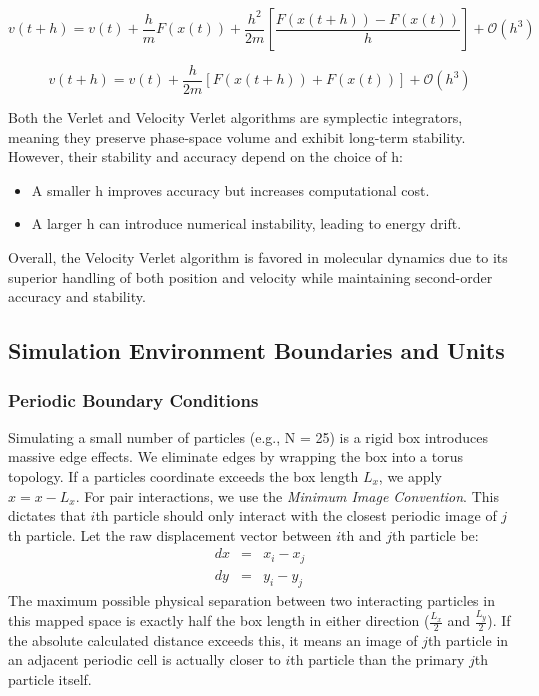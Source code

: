 \documentclass[12pt, a4paper, oneside]{article}
\begin{document}
            $$v(t+h) = v(t) + \frac{h}{m} F(x(t)) + \frac{h^2}{2m} \left[\frac{F(x(t+h)) - F(x(t))}{h}\right] + \mathcal{O}(h^3)$$

            \begin{equation}
                \label{eq9: Velocity verlet (Velocity Update)}
                v(t+h) = v(t) + \frac{h}{2m} \left[F(x(t+h)) + F(x(t))\right] + \mathcal{O}(h^3)
            \end{equation}
            
            Both the Verlet and Velocity Verlet algorithms are symplectic integrators, meaning they preserve phase-space volume and exhibit long-term stability. However, their stability and accuracy depend on the choice of h:
            \begin{itemize}
                \item A smaller h improves accuracy but increases computational cost.
                \item A larger h can introduce numerical instability, leading to energy drift.
            \end{itemize}
            Overall, the Velocity Verlet algorithm is favored in molecular dynamics due to its superior handling of both position and velocity while maintaining second-order accuracy and stability.

        \subsection{Simulation Environment Boundaries and Units}
            \subsubsection{Periodic Boundary Conditions}
            Simulating a small number of particles (e.g., N = 25) is a rigid box introduces massive edge effects. We eliminate edges by wrapping the box into a torus topology. If a particles coordinate exceeds the box length $L_x$, we apply $x = x - L_x$. For pair interactions, we use the \textit{Minimum Image Convention}. This dictates that $i$th particle should only interact with the closest periodic image of $j$th particle.
            Let the raw displacement vector between $i$th and $j$th particle be:
            \begin{eqnarray*}
                dx & = & x_i - x_j \\
                dy & = & y_i - y_j
            \end{eqnarray*}
            The maximum possible physical separation between two interacting particles in this mapped space is exactly half the box length in either direction ($\frac{L_x}{2}$ and $\frac{L_y}{2}$). If the absolute calculated distance exceeds this, it means an image of $j$th particle in an adjacent periodic cell is actually closer to $i$th particle than the primary $j$th particle  itself.
\end{document}
